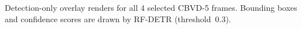 \caption{Detection-only overlay renders for all 4 selected CBVD-5 frames. Bounding boxes and confidence scores are drawn by RF-DETR (threshold~0.3).}\label{fig:detection-gallery-cbvd5}
